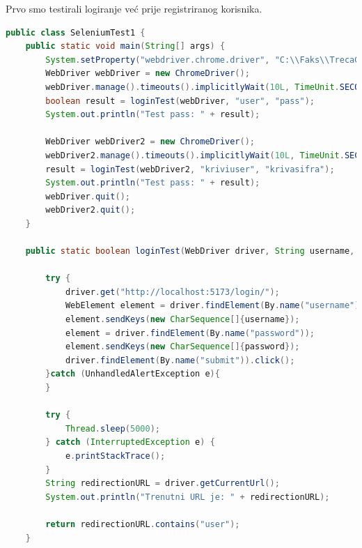             Prvo smo testirali logiranje već prije registriranog korisnika.
           \begin{lstlisting}[language=Java, label=lst:java_example, basicstyle=\scriptsize, baselinestretch=0.9]
 public class SeleniumTest1 {
    public static void main(String[] args) {
        System.setProperty("webdriver.chrome.driver", "C:\\Faks\\TrecaGod\\PROGI\\Projekt\\chromedriver-win64\\chromedriver.exe");
        WebDriver webDriver = new ChromeDriver();
        webDriver.manage().timeouts().implicitlyWait(10L, TimeUnit.SECONDS);
        boolean result = loginTest(webDriver, "user", "pass");
        System.out.println("Test pass: " + result);

        WebDriver webDriver2 = new ChromeDriver();
        webDriver2.manage().timeouts().implicitlyWait(10L, TimeUnit.SECONDS);
        result = loginTest(webDriver2, "kriviuser", "krivasifra");
        System.out.println("Test pass: " + result);
        webDriver.quit();
        webDriver2.quit();
    }

    public static boolean loginTest(WebDriver driver, String username, String password){

        try {
            driver.get("http://localhost:5173/login/");
            WebElement element = driver.findElement(By.name("username"));
            element.sendKeys(new CharSequence[]{username});
            element = driver.findElement(By.name("password"));
            element.sendKeys(new CharSequence[]{password});
            driver.findElement(By.name("submit")).click();
        }catch (UnhandledAlertException e){
        }

        try {
            Thread.sleep(5000);
        } catch (InterruptedException e) {
            e.printStackTrace();
        }
        String redirectionURL = driver.getCurrentUrl();
        System.out.println("Trenutni URL je: " + redirectionURL);

        return redirectionURL.contains("user");
    }
\end{lstlisting}

